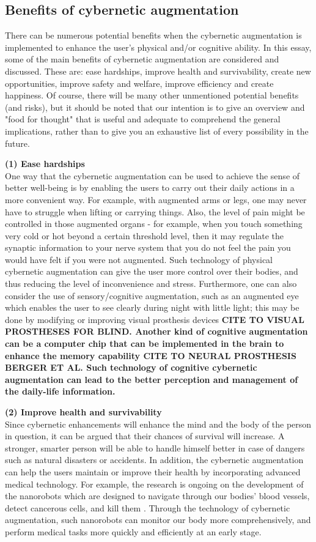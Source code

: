 \subsection{Benefits of cybernetic augmentation}

There can be numerous potential benefits when the cybernetic augmentation is implemented to enhance the user's physical and/or cognitive ability. In this essay, some of the main benefits of cybernetic augmentation are considered and discussed. These are: ease hardships, improve health and survivability, create new opportunities, improve safety and welfare, improve efficiency and create happiness. Of course, there will be many other unmentioned potential benefits (and risks), but it should be noted that our intention is to give an overview and "food for thought" that is useful and adequate to comprehend the general implications, rather than to give you an exhaustive list of every possibility in the future. 

{\bf (1) Ease hardships} \\ 
One way that the cybernetic augmentation can be used to achieve the sense of better well-being is by enabling the users to carry out their daily actions in a more convenient way. For example, with augmented arms or legs, one may never have to struggle when lifting or carrying things. Also, the level of pain might be controlled in those augmented organs - for example, when you touch something very cold or hot beyond a certain threshold level, then it may regulate the synaptic information to your nerve system that you do not feel the pain you would have felt if you were not augmented. Such technology of physical cybernetic augmentation can give the user more control over their bodies, and thus reducing the level of inconvenience and stress. Furthermore, one can also consider the use of sensory/cognitive augmentation, such as an augmented eye which enables the user to see clearly during night with little light; this may be done by modifying or improving visual prosthesis devices \bf{CITE TO VISUAL PROSTHESES FOR BLIND}. Another kind of cognitive augmentation can be a computer chip that can be implemented in the brain to enhance the memory capability \bf{CITE TO NEURAL PROSTHESIS BERGER ET AL}. Such technology of cognitive cybernetic augmentation can lead to the better perception and management of the daily-life information.

{\bf (2) Improve health and survivability} \\
Since cybernetic enhancements will enhance the mind and the body of the person in question, it can be argued that their chances of survival will increase. A stronger, smarter person will be able to handle himself better in case of dangers such as natural disasters or accidents. In addition, the cybernetic augmentation can help the users maintain or improve their health by incorporating advanced medical technology. For example, the research is ongoing on the development of the nanorobots which are designed to navigate through our bodies' blood vessels, detect cancerous cells, and kill them \cite{nanorobot}. Through the technology of cybernetic augmentation, such nanorobots can monitor our body more comprehensively, and perform medical tasks more quickly and efficiently at an early stage. 

